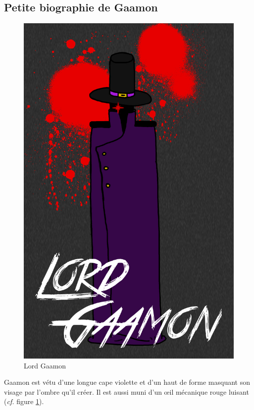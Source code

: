 \vspace*{-1mm}
\subsection{Petite biographie de Gaamon}
\begin{figure}[p]
	\center
	\includegraphics[width=\textwidth]{./images/Monde/Personnages/gaamonPortrait.png}
	\caption{Lord Gaamon\label{fig:Gaamon}}
\end{figure}

\vspace*{-2mm}
Gaamon est vétu d'une longue cape violette et d'un haut de forme masquant son visage par l'ombre qu'il créer. Il est aussi muni d'un \oe il mécanique rouge luisant (\textit{cf.} figure \ref{fig:Gaamon}).

